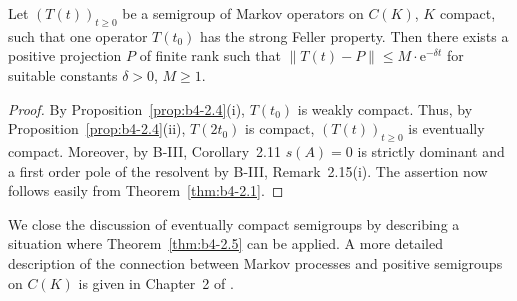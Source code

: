 \begin{theorem}\label{thm:b4-2.5}
	Let $(T(t))_{t \geq 0}$ be a semigroup of Markov operators on
	$C(K)$, $K$ compact, such that one operator $T(t_{0})$ has the strong Feller
	property.
	Then there exists a positive projection $P$ of finite rank
	such that $\|T(t) - P\| \leq M\cdot \mathrm{e}^{-\delta t}$ for suitable constants $\delta>0$, $M \geq 1$.
\end{theorem}

\begin{proof}
	By Proposition~\ref{prop:b4-2.4}(i), $T(t_{0})$ is weakly compact.
	Thus, by Proposition~\ref{prop:b4-2.4}(ii),
	$T(2t_{0})$ is compact, \ie  $(T(t))_{t \geq 0}$ is eventually compact.
	Moreover,
	by B-III, Corollary~2.11 $s(A) = 0$ is strictly dominant and a first order
	pole of the resolvent by B-III, Remark~2.15(i).
	The assertion now follows
	easily from Theorem~\ref{thm:b4-2.1}.
\end{proof}
We close the discussion of eventually compact semigroups by describing
a situation where Theorem~\ref{thm:b4-2.5} can be applied.
A more detailed description
of the connection between Markov processes and positive semigroups on
$C(K)$ is given in Chapter~2 of \citet{vancasteren:1985}.

